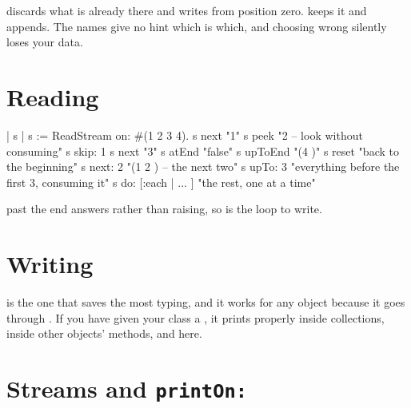 \begin{stwarn}
 discards what is already there and writes
from position zero.  keeps it and appends.
The names give no hint which is which, and choosing wrong silently loses your
data.
\end{stwarn}

\section{Reading}

\begin{st}
| s |
s := ReadStream on: #(1 2 3 4).
s next                     "1"
s peek                     "2 -- look without consuming"
s skip: 1
s next                     "3"
s atEnd                    "false"
s upToEnd                  "(4 )"
s reset                    "back to the beginning"
s next: 2                  "(1 2 ) -- the next two"
s upTo: 3                  "everything before the first 3, consuming it"
s do: [:each | ... ]       "the rest, one at a time"
\end{st}

 past the end answers  rather than raising, so
 is the loop to write.

\section{Writing}


 is the one that saves the most typing, and it works for any object
because it goes through . If you have given your class a
, it prints properly inside collections, inside other objects'
 methods, and here.

\section{Streams and \texttt{printOn:}}


